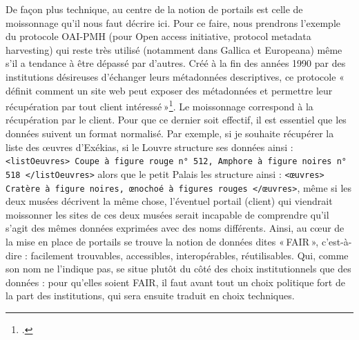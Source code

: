 De façon plus technique, au centre de la notion de portails est celle de moissonnage qu’il nous faut décrire ici. Pour ce faire, nous prendrons l’exemple du protocole OAI-PMH (pour Open access initiative, protocol metadata harvesting) qui reste très utilisé (notamment dans Gallica et Europeana) même s’il a tendance à être dépassé par d’autres. Créé à la fin des années 1990 par des institutions désireuses d’échanger leurs métadonnées descriptives, ce protocole « définit comment un site web peut exposer des métadonnées et permettre leur récupération par tout client intéressé »\footcite[§ 22]{mesguich_5_2017}. Le moissonnage correspond à la récupération par le client. Pour que ce dernier soit effectif, il est essentiel que les données suivent un format normalisé. Par exemple, si je souhaite récupérer la liste des œuvres d’Exékias, si le Louvre structure ses données ainsi : \texttt{<listOeuvres> Coupe à figure rouge n° 512, Amphore à figure noires n° 518 </listOeuvres>} alors que le petit Palais les structure ainsi : \texttt{<œuvres> Cratère à figure noires, œnochoé à figures rouges </œuvres>}, même si les deux musées décrivent la même chose, l’éventuel portail (client) qui viendrait moissonner les sites de ces deux musées serait incapable de comprendre qu’il s’agit des mêmes données exprimées avec des noms différents. Ainsi, au cœur de la mise en place de portails se trouve la notion de données dites « FAIR », c’est-à-dire : facilement trouvables, accessibles, interopérables, réutilisables. Qui, comme son nom ne l’indique pas, se situe plutôt du côté des choix institutionnels que des données : pour qu’elles soient FAIR, il faut avant tout un choix politique fort de la part des institutions, qui sera ensuite traduit en choix techniques.

